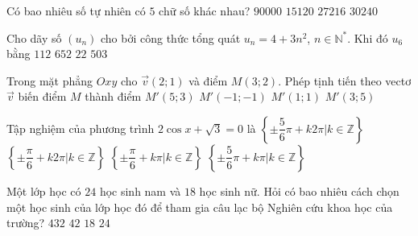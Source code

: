 \begin{ex}%
	Có bao nhiêu số tự nhiên có $5$ chữ số khác nhau?
	\choice
	{$90000$}
	{$15120$}
	{\True $27216$}
	{$30240$}
\end{ex}

\begin{ex}%
	Cho dãy số $(u_n )$ cho bởi công thức tổng quát $u_n = 4 +  3  n^ 2$, $n \in  \mathbb{N}^* $. Khi đó $u_6$ bằng
	\choice
	{\True $112$}
	{$652$}
	{$22$}
	{$503$}
\end{ex}

\begin{ex}%
	Trong mặt phẳng $Oxy$ cho $\vec{v}(2;1)$ và điểm $M (3;2)$. Phép tịnh tiến theo vectơ $\vec{v}$ biến điểm $M$ thành
	điểm 
	\choice
	{\True $M '(5; 3)$}
	{$M '(- 1;- 1)$}
	{$M '( 1; 1)$}
	{$M '(3; 5)$}
\end{ex}

\begin{ex}%
	Tập nghiệm của phương trình $2 \cos x + \sqrt{3}=0$ là
	\choice
	{\True $\left\lbrace \pm \dfrac{5}{6} \pi + k 2 \pi | k \in \mathbb{Z} \right\rbrace $}
	{$\left\lbrace \pm \dfrac{\pi}{6} + k 2 \pi | k \in \mathbb{Z} \right\rbrace $}
	{$\left\lbrace \pm \dfrac{\pi}{6}  + k  \pi | k \in \mathbb{Z} \right\rbrace $}
	{$\left\lbrace \pm \dfrac{5}{6} \pi + k  \pi | k \in \mathbb{Z} \right\rbrace $}
\end{ex}

\begin{ex}%
	 Một lớp học có $24$ học sinh nam và $18$ học sinh nữ. Hỏi có bao nhiêu cách chọn một học sinh của lớp
	học đó để tham gia câu lạc bộ Nghiên cứu khoa học của trường?
	\choice
	{$432$}
	{\True $42$}
	{$18$}
	{$24$}
\end{ex}

